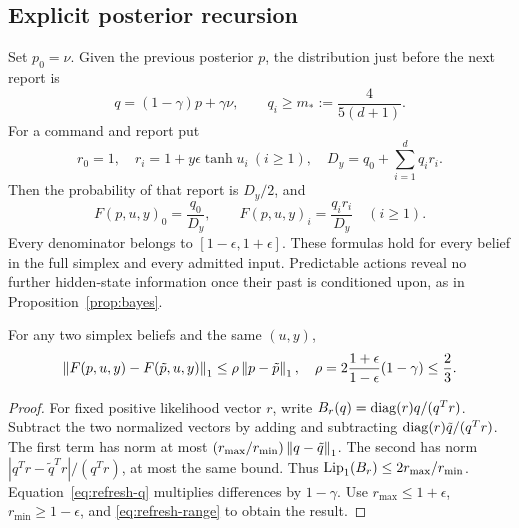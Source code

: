 \subsection{Explicit posterior recursion}
Set $p_0=\nu$. Given the previous posterior $p$, the distribution just before
the next report is
\begin{equation}\label{eq:refresh-q}
 q=(1-\gamma)p+\gamma\nu,
 \qquad q_i\ge m_*:=\frac{4}{5(d+1)}.
\end{equation}
For a command and report put
\[
 r_0=1,\quad r_i=1+y\epsilon\tanh u_i\ (i\ge1),
 \quad D_y=q_0+\sum_{i=1}^dq_ir_i.
\]
Then the probability of that report is $D_y/2$, and
\begin{equation}\label{eq:refresh-update}
 F(p,u,y)_0=\frac{q_0}{D_y},
 \qquad F(p,u,y)_i=\frac{q_ir_i}{D_y}\quad(i\ge1).
\end{equation}
Every denominator belongs to $[1-\epsilon,1+\epsilon]$. These formulas
hold for every belief in the full simplex and every admitted input.
Predictable actions reveal no further hidden-state information once their
past is conditioned upon, as in Proposition~\ref{prop:bayes}.

\begin{lemma}\label{lem:refresh-contraction}
For any two simplex beliefs and the same $(u,y)$,
\begin{equation}\label{eq:refresh-contraction}
 \left\lVert F(p,u,y)-F(\tilde p,u,y)\right\rVert_1
 \le\rho\left\lVert p-\tilde p\right\rVert_1,
 \quad
 \rho=2\frac{1+\epsilon}{1-\epsilon}(1-\gamma)\le\frac23.
\end{equation}
\end{lemma}
\begin{proof}
For fixed positive likelihood vector $r$, write $B_r(q)=\operatorname{diag}(r)q/(q^Tr)$.
Subtract the two normalized vectors by adding and subtracting
$\operatorname{diag}(r)\tilde q/(q^Tr)$. The first term has norm at most
$(r_{\max}/r_{\min})\left\lVert q-\tilde q\right\rVert_1$. The second has norm
$|q^Tr-\tilde q^Tr|/(q^Tr)$, at most the same bound. Thus
$\operatorname{Lip}_1(B_r)\le2r_{\max}/r_{\min}$.
Equation~\eqref{eq:refresh-q} multiplies differences by $1-\gamma$.
Use $r_{\max}\le1+\epsilon$, $r_{\min}\ge1-\epsilon$, and
\eqref{eq:refresh-range} to obtain the result.
\end{proof}

